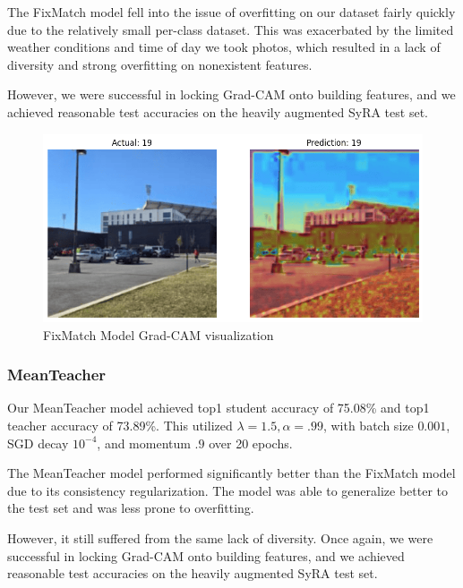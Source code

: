 \documentclass{article}
\begin{document}
The FixMatch model fell into the issue of overfitting on our dataset fairly quickly due to the relatively small per-class dataset. This was exacerbated by the limited weather conditions and time of day we took photos, which resulted in a lack of diversity and strong overfitting on nonexistent features. 

However, we were successful in locking Grad-CAM onto building features, and we achieved reasonable test accuracies on the heavily augmented SyRA test set.

\begin{figure}[H]
    \centering
    \includegraphics[width=0.8\linewidth]{fixmatch.png}
    \caption{FixMatch Model Grad-CAM visualization}
    \label{fig:fixmatch_results}
\end{figure}

\subsubsection{MeanTeacher}

Our MeanTeacher model achieved top1 student accuracy of 75.08\% and top1 teacher accuracy of 73.89\%. This utilized $\lambda=1.5, \alpha=.99$, with batch size $0.001$, SGD decay $10^{-4}$, and momentum $.9$ over 20 epochs.

The MeanTeacher model performed significantly better than the FixMatch model due to its consistency regularization. The model was able to generalize better to the test set and was less prone to overfitting. 

However, it still suffered from the same lack of diversity. Once again, we were successful in locking Grad-CAM onto building features, and we achieved reasonable test accuracies on the heavily augmented SyRA test set.
\end{document}
